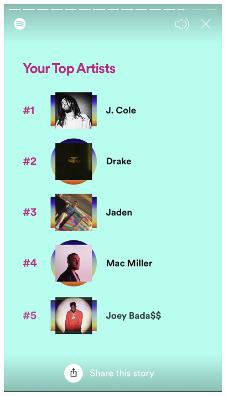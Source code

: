 \documentclass{report}
\begin{document}
\begin{figure}
\begin{minipage}[b]{0.25\textwidth}
    \includegraphics[width=\textwidth]{Imagens/IMG_3833.PNG}
  \end{minipage}
  \hfill
  \begin{minipage}[b]{0.25\textwidth}

\end{minipage}
\end{figure}
\end{document}

